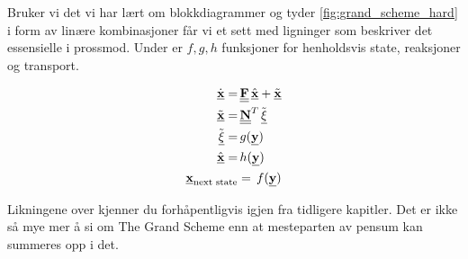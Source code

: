 Bruker vi det vi har lært om blokkdiagrammer og tyder \cref{fig:grand_scheme_hard} i form av linære kombinasjoner får vi et sett med ligninger som beskriver det essensielle i prossmod. Under er $f,g,h$ funksjoner for henholdsvis state, reaksjoner og transport. 

\begin{equation}
\label{eq:The_grand_scheme}
    \begin{split}
    \underline{\dot{\textbf{x}}} =&\, \underline{\underline{\textbf{F}}}\,\underline{\hat{\textbf{x}}} + \underline{\Tilde{\textbf{x}}} \\
    \underline{\Tilde{\textbf{x}}} =&\, \underline{\underline{\textbf{N}}}^T\,\Tilde{\underline{\xi}} \\
    \Tilde{\underline{\xi}} =&\, g(\underline{\textbf{y}}) \\
    \underline{\hat{\textbf{x}}} =&\, h(\underline{\textbf{y}}) \\
    \underline{\textbf{x}}_{\text{next state}} &=\, f(\underline{\textbf{y}}) 
    \end{split}
\end{equation}
    
Likningene over kjenner du forhåpentligvis igjen fra tidligere kapitler. Det er ikke så mye mer å si om The Grand Scheme enn at mesteparten av pensum kan summeres opp i det. 
